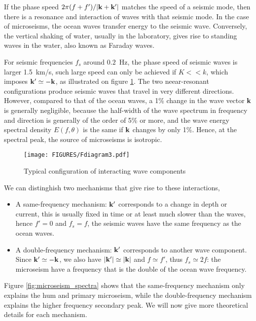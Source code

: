 If the phase speed $2 \pi (f+f')/|\mathbf{k}+\mathbf{k^{\prime}}|$ matches the speed of a seismic mode, 
then there is a resonance and interaction of waves with that seismic mode. In the case of microseisms, the ocean waves transfer energy to the seismic wave. 
Conversely, the vertical shaking of water, usually in the laboratory, gives rise to standing waves in the water, also known as Faraday waves. 

For seismic frequencies $f_s$ around $0.2$~Hz, the phase speed of seismic waves is larger 1.5~km/s, such large speed can only be achieved if $K << k$, which imposes $\mathbf{k^{\prime}} \simeq - \mathbf{k}$, as illustrated on 
figure \ref{fig:kpluskprime}. The two neear-resonant configurations produce seismic waves that travel in very different directions. However, compared to that 
of the ocean waves, a 1\% change in the wave vector $\mathbf{k}$ is generally negligible, because the half-width of the wave spectrum in frequency and direction is generally of the order of 5\% or more, 
and the wave energy spectral density $E(f,\theta)$ is the same if $\mathbf{k}$ changes by only 1\%. Hence, 
at the spectral peak, the source of microseisms is isotropic. 
\begin{figure}[htb]
\centerline{\texttt{[image: FIGURES/Fdiagram3.pdf]}}
  \caption{Typical configuration of interacting wave components}
\label{fig:kpluskprime}
\end{figure}

We can distinghish two mechanisms that give rise to these interactions, 
\begin{itemize}
 \item A same-frequency mechanism:  $\mathbf{k^{\prime}}$ corresponds to a change in depth or current, this is usually fixed in time or at least much slower than the waves, hence $f'=0$ and $f_s=f$, the seismic 
 waves have the same frequency as the ocean waves. 
 \item A double-frequency mechanism:  $\mathbf{k^{\prime}}$ corresponds to another wave component. Since  $\mathbf{k^{\prime}} \simeq - \mathbf{k}$, we also have   $|\mathbf{k^{\prime}}| \simeq |\mathbf{k}|$  and $f \simeq f'$, thus $f_s \simeq 2 f$: the 
 microseism have a frequency that is the double of the ocean wave frequency. 
\end{itemize}

Figure \ref{fig:microseism_spectra} shows that the same-frequency mechanism only  explains the hum and primary microseism, while the double-frequency mechanism explains the 
higher frequency secondary peak.  We will now give more theoretical details for each mechanism.


